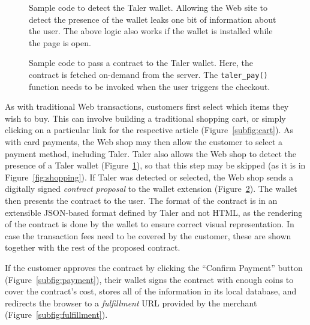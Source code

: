 \documentclass{llncs}
\begin{document}
\begin{figure}[h!]
 \lstset{language=JavaScript}
 
 \caption{Sample code to detect the Taler wallet. Allowing the
  Web site to detect the presence of the wallet leaks one bit
  of information about the user. The above logic also works
  if the wallet is installed while the page is open.}
  \label{listing:presence}
\end{figure}


\begin{figure}[h!]
 \lstset{language=JavaScript}
 
 \caption{Sample code to pass a contract to the Taler wallet.
          Here, the contract is fetched on-demand from the server.
          The {\tt taler\_pay()} function needs to be invoked
          when the user triggers the checkout.}
 \label{listing:contract}
\end{figure}



As with traditional Web transactions, customers first select which
items they wish to buy.  This can involve building a traditional
shopping cart, or simply clicking on a particular link for the
respective article (Figure~\ref{subfig:cart}).  As with card payments,
the Web shop may then allow the customer to select a payment method,
including Taler.  Taler also allows the Web shop to detect
the presence of a Taler wallet (Figure~\ref{listing:presence}), so
that this step may be skipped (as it is in Figure~\ref{fig:shopping}).
If Taler was detected or selected, the Web shop sends a digitally
signed {\em contract proposal} to the wallet extension
(Figure~\ref{listing:contract}).  The wallet then presents the
contract to the user.  The format of the contract is in an extensible
JSON-based format defined by Taler and not HTML, as the
rendering of the contract is done by the wallet to ensure correct
visual representation.  In case the transaction fees need to be
covered by the customer, these are shown together with the rest of the
proposed contract.

If the customer approves the contract by clicking the ``Confirm
Payment'' button (Figure~\ref{subfig:payment}), their wallet signs the
contract with enough coins to cover the contract's cost, stores all of
the information in its local database, and redirects the browser to a
{\em fulfillment} URL provided by the merchant
(Figure~\ref{subfig:fulfillment}).
\end{document}
